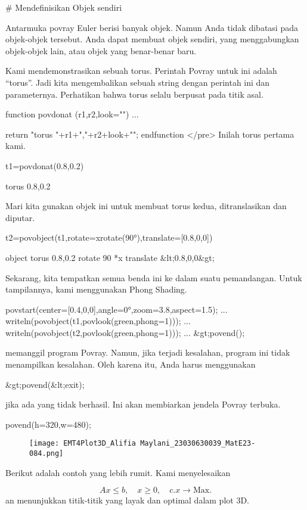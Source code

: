 \documentclass{article}
\begin{document}
# Mendefinisikan Objek sendiri

Antarmuka povray Euler berisi banyak objek. Namun Anda tidak dibatasi
pada objek-objek tersebut. Anda dapat membuat objek sendiri, yang
menggabungkan objek-objek lain, atau objek yang benar-benar baru.


Kami mendemonstrasikan sebuah torus. Perintah Povray untuk ini adalah
“torus”. Jadi kita mengembalikan sebuah string dengan perintah ini dan
parameternya. Perhatikan bahwa torus selalu berpusat pada titik asal.


\>function povdonat (r1,r2,look="") ...


      return "torus {"+r1+","+r2+look+"}";
    endfunction
</pre>
Inilah torus pertama kami.


\>t1=povdonat(0.8,0.2)


    torus {0.8,0.2}

Mari kita gunakan objek ini untuk membuat torus kedua, ditranslasikan
dan diputar.


\>t2=povobject(t1,rotate=xrotate(90°),translate=[0.8,0,0])


    object { torus {0.8,0.2}
     rotate 90 *x 
     translate &lt;0.8,0,0&gt;
     }

Sekarang, kita tempatkan semua benda ini ke dalam suatu pemandangan.
Untuk tampilannya, kami menggunakan Phong Shading.


\>povstart(center=[0.4,0,0],angle=0°,zoom=3.8,aspect=1.5); ...  
\>   writeln(povobject(t1,povlook(green,phong=1))); ...  
\>   writeln(povobject(t2,povlook(green,phong=1))); ...  
\>  
 &gt;povend();  

memanggil program Povray. Namun, jika terjadi kesalahan, program ini
tidak menampilkan kesalahan. Oleh karena itu, Anda harus menggunakan


 &gt;povend(&lt;exit);  

jika ada yang tidak berhasil. Ini akan membiarkan jendela Povray
terbuka.


\>povend(h=320,w=480);


\begin{figure}
    \centering
    \texttt{[image: EMT4Plot3D\_Alifia Maylani\_23030630039\_MatE23-084.png]}
    \caption{}
    \label{fig:enter-label}
\end{figure}

Berikut adalah contoh yang lebih rumit. Kami menyelesaikan


$$Ax \le b, \quad x \ge 0, \quad c.x \to \text{Max.}$$an menunjukkan titik-titik yang layak dan optimal dalam plot 3D.
\end{document}
